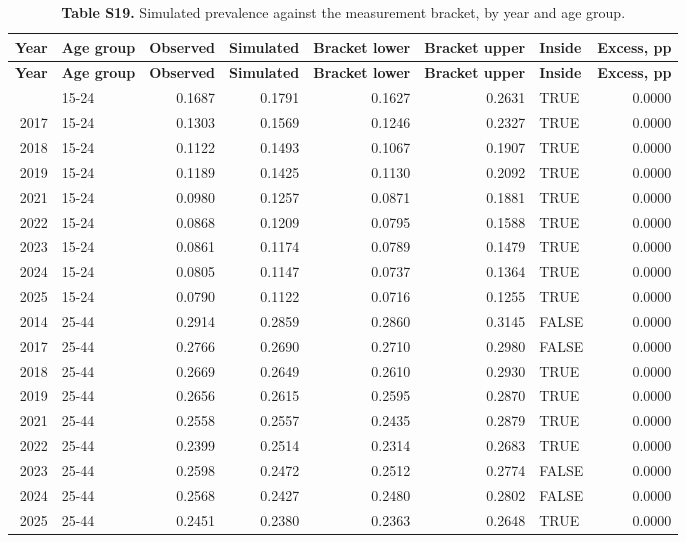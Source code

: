 \scriptsize
\begin{longtable}{rlrrrrlr}
\caption{\textbf{Table S19.} Simulated prevalence against the measurement bracket, by year and age group.}\\
\toprule
\textbf{Year} & \textbf{Age group} & \textbf{Observed} & \textbf{Simulated} & \textbf{Bracket lower} & \textbf{Bracket upper} & \textbf{Inside} & \textbf{Excess, pp} \\
\midrule
\endfirsthead
\toprule
\textbf{Year} & \textbf{Age group} & \textbf{Observed} & \textbf{Simulated} & \textbf{Bracket lower} & \textbf{Bracket upper} & \textbf{Inside} & \textbf{Excess, pp} \\
\midrule
\endhead
\bottomrule
\endfoot
2014 & 15-24 & 0.1687 & 0.1791 & 0.1627 & 0.2631 & TRUE & 0.0000 \\
2017 & 15-24 & 0.1303 & 0.1569 & 0.1246 & 0.2327 & TRUE & 0.0000 \\
2018 & 15-24 & 0.1122 & 0.1493 & 0.1067 & 0.1907 & TRUE & 0.0000 \\
2019 & 15-24 & 0.1189 & 0.1425 & 0.1130 & 0.2092 & TRUE & 0.0000 \\
2021 & 15-24 & 0.0980 & 0.1257 & 0.0871 & 0.1881 & TRUE & 0.0000 \\
2022 & 15-24 & 0.0868 & 0.1209 & 0.0795 & 0.1588 & TRUE & 0.0000 \\
2023 & 15-24 & 0.0861 & 0.1174 & 0.0789 & 0.1479 & TRUE & 0.0000 \\
2024 & 15-24 & 0.0805 & 0.1147 & 0.0737 & 0.1364 & TRUE & 0.0000 \\
2025 & 15-24 & 0.0790 & 0.1122 & 0.0716 & 0.1255 & TRUE & 0.0000 \\
2014 & 25-44 & 0.2914 & 0.2859 & 0.2860 & 0.3145 & FALSE & 0.0000 \\
2017 & 25-44 & 0.2766 & 0.2690 & 0.2710 & 0.2980 & FALSE & 0.0000 \\
2018 & 25-44 & 0.2669 & 0.2649 & 0.2610 & 0.2930 & TRUE & 0.0000 \\
2019 & 25-44 & 0.2656 & 0.2615 & 0.2595 & 0.2870 & TRUE & 0.0000 \\
2021 & 25-44 & 0.2558 & 0.2557 & 0.2435 & 0.2879 & TRUE & 0.0000 \\
2022 & 25-44 & 0.2399 & 0.2514 & 0.2314 & 0.2683 & TRUE & 0.0000 \\
2023 & 25-44 & 0.2598 & 0.2472 & 0.2512 & 0.2774 & FALSE & 0.0000 \\
2024 & 25-44 & 0.2568 & 0.2427 & 0.2480 & 0.2802 & FALSE & 0.0000 \\
2025 & 25-44 & 0.2451 & 0.2380 & 0.2363 & 0.2648 & TRUE & 0.0000 \\

\end{longtable}
